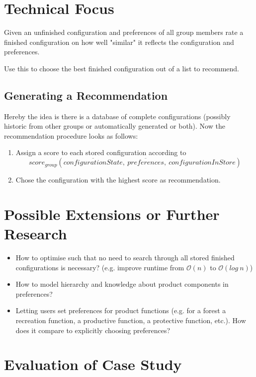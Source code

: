 \documentclass{article}
\begin{document}
\section{Technical Focus}

Given an unfinished configuration and preferences of all group members rate a finished configuration on how well "similar" it reflects the configuration and preferences.

Use this to choose the best finished configuration out of a list to recommend.

\subsection{Generating a Recommendation}

Hereby the idea is there is a database of complete configurations (possibly historic from other groups or automatically generated or both).
Now the recommendation procedure looks as follows:

\begin{enumerate}
    \item Assign a score to each stored configuration according to $$score_{group}(\overline{configurationState},\ \overline{preferences}, \ configurationInStore)$$
    \item Chose the configuration with the highest score as recommendation.
\end{enumerate}


\section{Possible Extensions or Further Research}

\begin{itemize}
    \item How to optimise such that no need to search through all stored finished configurations is necessary? (e.g. improve runtime from $\mathcal{O}(n)$ to $\mathcal{O}(log\ n)$)
    \item How to model hierarchy and knowledge about product components in preferences?
    \item Letting users set preferences for product functions (e.g. for a forest a recreation function, a productive function, a protective function, etc.). How does it compare to explicitly choosing preferences?
\end{itemize}
    
    
\section{Evaluation of Case Study}
\end{document}
